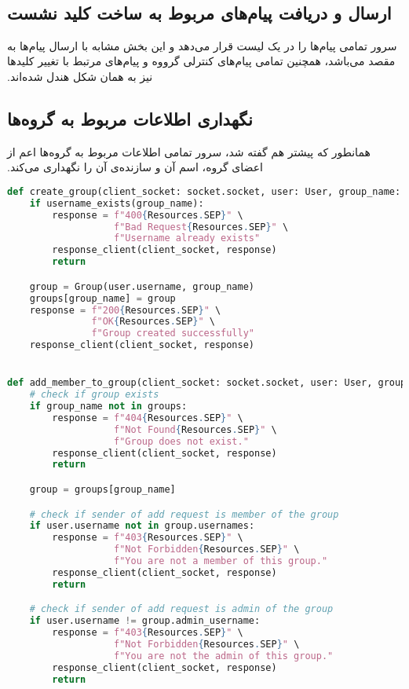 ‫\subsection{ارسال و دریافت پیام‌های مربوط به ساخت کلید نشست}
‫سرور تمامی پیام‌ها را در یک لیست قرار می‌دهد و این بخش مشابه با ارسال پیام‌ها به مقصد می‌باشد، همچنین تمامی پیام‌های کنترلی گرووه و پیام‌های مرتبط با تغییر کلیدها نیز به همان شکل هندل شده‌اند.
‫
‫\subsection{نگهداری اطلاعات مربوط به گروه‌ها}
‫همانطور که پیشتر هم گفته شد، سرور تمامی اطلاعات مربوط به گروه‌ها اعم از اعضای گروه، اسم آن و سازنده‌ی آن را نگهداری می‌کند.
‫
\begin{latin}
\begin{lstlisting}[firstnumber=234, language=Python]
def create_group(client_socket: socket.socket, user: User, group_name: str):
    if username_exists(group_name):
        response = f"400{Resources.SEP}" \
                   f"Bad Request{Resources.SEP}" \
                   f"Username already exists"
        response_client(client_socket, response)
        return

    group = Group(user.username, group_name)
    groups[group_name] = group
    response = f"200{Resources.SEP}" \
               f"OK{Resources.SEP}" \
               f"Group created successfully"
    response_client(client_socket, response)


def add_member_to_group(client_socket: socket.socket, user: User, group_name, new_member_username):
    # check if group exists
    if group_name not in groups:
        response = f"404{Resources.SEP}" \
                   f"Not Found{Resources.SEP}" \
                   f"Group does not exist."
        response_client(client_socket, response)
        return

    group = groups[group_name]

    # check if sender of add request is member of the group
    if user.username not in group.usernames:
        response = f"403{Resources.SEP}" \
                   f"Not Forbidden{Resources.SEP}" \
                   f"You are not a member of this group."
        response_client(client_socket, response)
        return

    # check if sender of add request is admin of the group
    if user.username != group.admin_username:
        response = f"403{Resources.SEP}" \
                   f"Not Forbidden{Resources.SEP}" \
                   f"You are not the admin of this group."
        response_client(client_socket, response)
        return


\end{lstlisting}
\end{latin}
